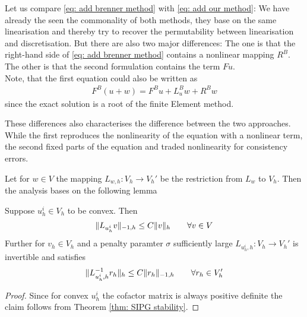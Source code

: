 Let us compare \eqref{eq: add brenner method} with \eqref{eq: add our method}: We have already the seen the commonality of both methods, they base on the same linearisation and thereby try to recover the permutability between linearisation and discretisation. 
But there are also two major differences: The one is that the right-hand side of \eqref{eq: add brenner method} contains a nonlinear mapping $R^B$. The other is that the second formulation contains the term $Fu$. \\
Note, that the first equation could also be written as 
 \begin{align*}
 F^B(u +w ) = F^B u + L^B_u w + R^Bw 
 \end{align*}
since the exact \MA solution is a root of the finite Element method. 

These differences also characterises the difference between the two approaches. 
While the first reproduces the nonlinearity of the \MA equation with a nonlinear term, the second fixed parts of the equation and traded nonlinearity for consistency errors.

Let for $w \in V$ the mapping $L_{w,h}:V_h \rightarrow V_h'$ be the restriction from $L_w$ to $V_h$. Then the analysis bases on the following lemma
\begin{lemma}[Stability] \label{la: stability L}
	Suppose $u_h^i \in V_h$ to be convex. Then 
	\begin{align}
		\lVert L_{u_h^i}v \rVert_{-1,h} \leq C \lVert v \rVert_{h} \qquad \forall v \in V
	\end{align}
	Further for $v_h \in V_h$ and a penalty paramter $\sigma $ sufficiently large $L_{u^i_h,h}: V_h \rightarrow V_h'$ is invertible and satisfies
	\begin{align}
		\lVert L_{u^i_h,h}^{-1} r_h \rVert_{h} \leq C \lVert r_h \rVert_{-1,h} \qquad \forall r_h \in V_h'
	\end{align}
\end{lemma}
\begin{proof}
	Since for convex $u_h^i$ the cofactor matrix is always positive definite the claim follows from Theorem \ref{thm: SIPG stability}.
\end{proof}




